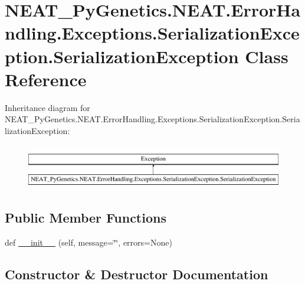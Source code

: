 \hypertarget{classNEAT__PyGenetics_1_1NEAT_1_1ErrorHandling_1_1Exceptions_1_1SerializationException_1_1SerializationException}{}\section{N\+E\+A\+T\+\_\+\+Py\+Genetics.\+N\+E\+A\+T.\+Error\+Handling.\+Exceptions.\+Serialization\+Exception.\+Serialization\+Exception Class Reference}
\label{classNEAT__PyGenetics_1_1NEAT_1_1ErrorHandling_1_1Exceptions_1_1SerializationException_1_1SerializationException}
Inheritance diagram for N\+E\+A\+T\+\_\+\+Py\+Genetics.\+N\+E\+A\+T.\+Error\+Handling.\+Exceptions.\+Serialization\+Exception.\+Serialization\+Exception\+:\begin{figure}[H]
\begin{center}
\leavevmode
\includegraphics[height=1.978799cm]{classNEAT__PyGenetics_1_1NEAT_1_1ErrorHandling_1_1Exceptions_1_1SerializationException_1_1SerializationException}
\end{center}
\end{figure}
\subsection*{Public Member Functions}
\begin{DoxyCompactItemize}
\item 
def \hyperlink{classNEAT__PyGenetics_1_1NEAT_1_1ErrorHandling_1_1Exceptions_1_1SerializationException_1_1SerializationException_ada817ecebb49fc5dc085531462eef9a0}{\+\_\+\+\_\+init\+\_\+\+\_\+} (self, message=\char`\"{}\char`\"{}, errors=None)
\end{DoxyCompactItemize}


\subsection{Constructor \& Destructor Documentation}
